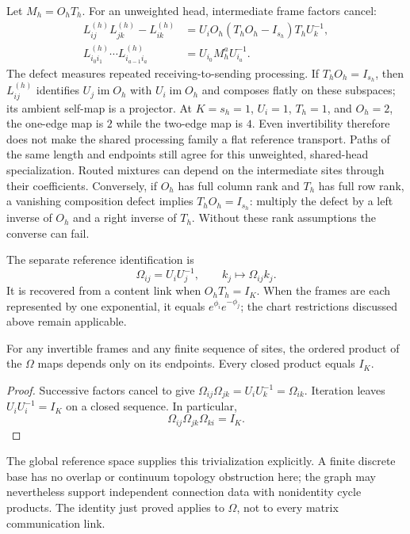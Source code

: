 \documentclass[twoside,11pt]{article}
\begin{document}
Let $M_h=O_hT_h$. For an unweighted head, intermediate frame factors cancel:
\begin{align}
L_{ij}^{(h)}L_{jk}^{(h)}-L_{ik}^{(h)}
&=U_iO_h(T_hO_h-I_{s_h})T_hU_k^{-1},\\
L_{i_0i_1}^{(h)}\cdots L_{i_{a-1}i_a}^{(h)}
&=U_{i_0}M_h^aU_{i_a}^{-1}.
\label{eq:main_link_composition}
\end{align}
The defect measures repeated receiving-to-sending processing. If $T_hO_h=I_{s_h}$, then $L_{ij}^{(h)}$ identifies $U_j\operatorname{im}O_h$ with $U_i\operatorname{im}O_h$ and composes flatly on these subspaces; its ambient self-map is a projector. At $K=s_h=1$, $U_i=1$, $T_h=1$, and $O_h=2$, the one-edge map is $2$ while the two-edge map is $4$. Even invertibility therefore does not make the shared processing family a flat reference transport. Paths of the same length and endpoints still agree for this unweighted, shared-head specialization. Routed mixtures can depend on the intermediate sites through their coefficients. Conversely, if \(O_h\) has full column rank and \(T_h\) has full row rank, a vanishing composition defect implies \(T_hO_h=I_{s_h}\): multiply the defect by a left inverse of \(O_h\) and a right inverse of \(T_h\). Without these rank assumptions the converse can fail.

The separate reference identification is
\begin{equation}
\Omega_{ij}=U_iU_j^{-1},\qquad
k_j\mapsto\Omega_{ij}k_j.
\label{eq:gauge_frame_rotation}
\end{equation}
It is recovered from a content link when $O_hT_h=I_K$. When the frames are each represented by one exponential, it equals $e^{\phi_i}e^{-\phi_j}$; the chart restrictions discussed above remain applicable.
\begin{lemma}
\label{thm:vanishing_holonomy}
For any invertible frames and any finite sequence of sites, the ordered product of the $\Omega$ maps depends only on its endpoints. Every closed product equals $I_K$.
\end{lemma}
\begin{proof}
Successive factors cancel to give $\Omega_{ij}\Omega_{jk}=U_iU_k^{-1}=\Omega_{ik}$. Iteration leaves $U_iU_i^{-1}=I_K$ on a closed sequence. In particular,
\begin{equation}
\Omega_{ij}\Omega_{jk}\Omega_{ki}=I_K.
\label{eq:holonomy}
\end{equation}
\end{proof}
The global reference space supplies this trivialization explicitly. A finite discrete base has no overlap or continuum topology obstruction here; the graph may nevertheless support independent connection data with nonidentity cycle products. The identity just proved applies to $\Omega$, not to every matrix communication link.
\end{document}
